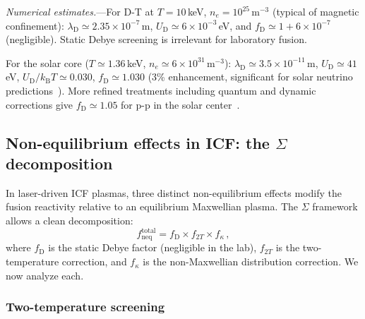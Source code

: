 \documentclass[prc,twocolumn,superscriptaddress,longbibliography,floatfix]{revtex4-2}
\newcommand{\kB}{k_{\mathrm{B}}}
\newcommand{\lD}{\lambda_{\mathrm{D}}}
\newcommand{\UD}{U_{\mathrm{D}}}
\newcommand{\fD}{f_{\mathrm{D}}}
\newcommand{\fneq}{f_{\mathrm{neq}}}
\begin{document}
\textit{Numerical estimates.}---For D-T at $T = 10\,$keV,
$n_{e} = 10^{25}\,\mathrm{m}^{-3}$ (typical of magnetic confinement):
$\lD \simeq 2.35\times 10^{-7}\,$m,
$\UD \simeq 6\times 10^{-3}\,$eV, and $\fD \simeq 1 + 6\times 10^{-7}$
(negligible).  Static Debye screening is irrelevant for laboratory
fusion.

For the solar core ($T \simeq 1.36\,$keV,
$n_{e}\simeq 6\times 10^{31}\,\mathrm{m}^{-3}$):
$\lD \simeq 3.5\times 10^{-11}\,$m,
$\UD \simeq 41\,$eV, $\UD/\kB T \simeq 0.030$,
$\fD \simeq 1.030$ (3\% enhancement, significant for solar
neutrino predictions~\cite{Bahcall1998}).  More refined treatments
including quantum and dynamic corrections give $\fD \simeq 1.05$
for p-p in the solar center~\cite{Ichimaru1993,Gruzinov1998}.

\subsection{Non-equilibrium effects in ICF: the $\Sigma$ decomposition}

In laser-driven ICF plasmas, three distinct non-equilibrium effects
modify the fusion reactivity relative to an equilibrium Maxwellian
plasma.  The $\Sigma$ framework allows a clean decomposition:
\begin{equation}
\fneq^{\mathrm{total}}
= \fD \times f_{2T} \times f_{\kappa}\,,
\label{eq:f_decomposition}
\end{equation}
where $\fD$ is the static Debye factor (negligible in the lab),
$f_{2T}$ is the two-temperature correction, and $f_{\kappa}$ is the
non-Maxwellian distribution correction.  We now analyze each.

\subsubsection{Two-temperature screening}
\end{document}
